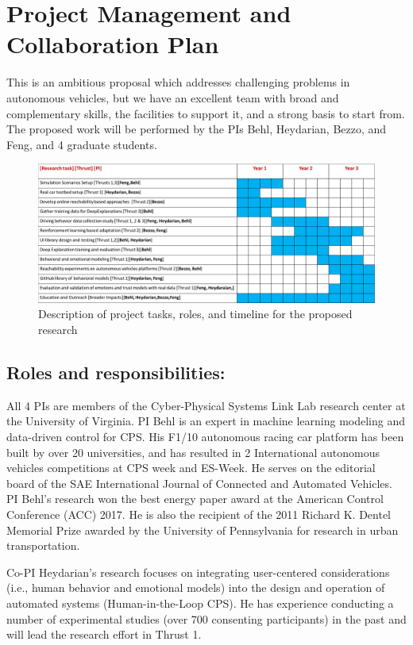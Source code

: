 \section{Project Management and Collaboration Plan}
\label{sec:plan}
This is an ambitious proposal which addresses challenging problems in autonomous vehicles, but we have an excellent team with broad and complementary skills, the facilities to support it, and a strong basis to start from.
The proposed work will be performed by the PIs Behl, Heydarian, Bezzo, and Feng, and 4 graduate students.
\begin{figure}
    \centering
    \includegraphics[width=0.7\columnwidth]{figures/gantt_plan.png}
    \caption{Description of project tasks, roles, and timeline for the proposed research}
    \label{fig:gantt}
\end{figure}

\subsection{Roles and responsibilities:}
All 4 PIs are members of the Cyber-Physical Systems Link Lab research center at the University of Virginia.
PI Behl is an expert in machine learning modeling and data-driven control for CPS. His F1/10 autonomous racing car platform has been built by over 20 universities, and has resulted in 2 International autonomous vehicles competitions at CPS week and ES-Week. He serves on the editorial board of the SAE International Journal of Connected and Automated Vehicles. PI Behl's research won the best energy paper award at the American Control Conference (ACC) 2017. He is also the recipient of the 2011 Richard K. Dentel Memorial Prize awarded by the University of Pennsylvania for research in urban transportation.

Co-PI Heydarian’s research focuses on integrating user-centered considerations (i.e., human behavior and emotional models) into the design and operation of automated systems (Human-in-the-Loop CPS).  He has experience conducting a number of experimental studies (over 700 consenting participants) in the past and will lead the research effort in Thrust 1.

